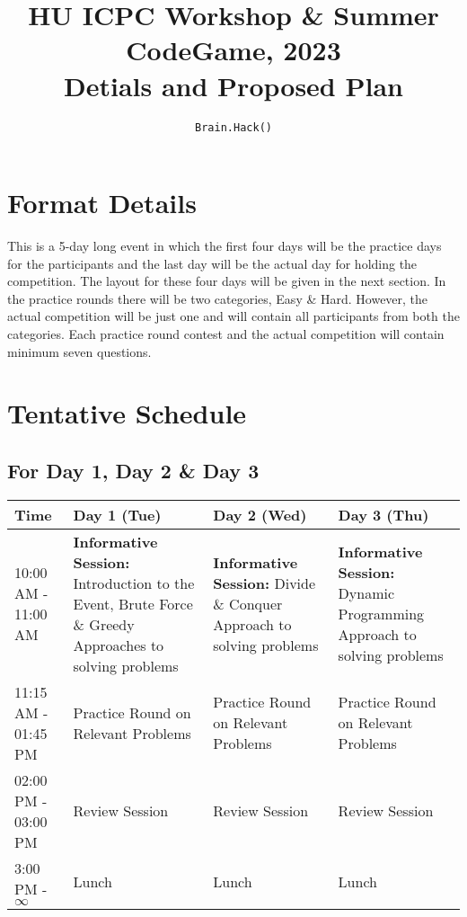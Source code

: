 \documentclass[12pt]{article}
\title{HU ICPC Workshop \& Summer CodeGame, 2023 \\ Detials and Proposed Plan}
\author{\texttt{Brain.Hack()}}
\date{}
\begin{document}
\maketitle
\pagebreak

\section*{\centering Format Details}
This is a 5-day long event in which the first four days will be the practice days for the participants and the last day will be the actual day for holding the competition. The layout for these four days will be given in the next section. In the practice rounds there will be two categories, Easy \& Hard. However, the actual competition will be just one and will contain all participants from both the categories. Each practice round contest and the actual competition will contain minimum seven questions.

\section*{\centering Tentative Schedule}
\subsection*{\centering For Day 1, Day 2 \& Day 3}
\begin{table}[H]
  \centering
  \begin{tabular}{|p{2.1cm}|p{4.3cm}|p{4.3cm}|p{4.3cm}|}
    \hline
    Time & Day 1 (Tue) & Day 2 (Wed) & Day 3 (Thu) \\ 
    \hline
    10:00 AM - 11:00 AM & \textbf{Informative Session:} Introduction to the Event, Brute Force \& Greedy Approaches to solving problems & \textbf{Informative Session:} Divide \& Conquer Approach to solving problems  & \textbf{Informative Session:} Dynamic Programming Approach to solving problems \\
    \hline
    11:15 AM - 01:45 PM & Practice Round on Relevant Problems & Practice Round on Relevant Problems & Practice Round on Relevant Problems \\
    \hline
    02:00 PM - 03:00 PM & Review Session & Review Session & Review Session \\
    \hline
    3:00 PM - $\infty$ & Lunch & Lunch & Lunch \\
    \hline
  \end{tabular}
\end{table}
\end{document}
